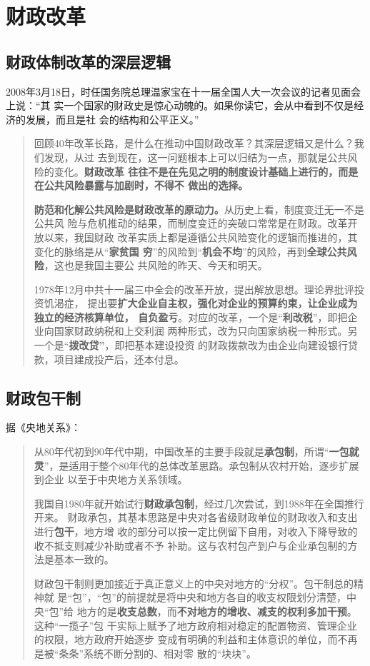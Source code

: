 \section{财政改革}

\subsection{财政体制改革的深层逻辑}

2008年3月18日，时任国务院总理温家宝在十一届全国人大一次会议的记者见面会上说：“其
实一个国家的财政史是惊心动魄的。如果你读它，会从中看到不仅是经济的发展，而且是社
会的结构和公平正义。”

\begin{quotation}
  回顾40年改革长路，是什么在推动中国财政改革？其深层逻辑又是什么？我们发现，从过
  去到现在，这一问题根本上可以归结为一点，那就是公共风险的变化。\textbf{财政改革
    往往不是在先见之明的制度设计基础上进行的，而是在公共风险暴露与加剧时，不得不
    做出的选择。}

  \textbf{防范和化解公共风险是财政改革的原动力。}从历史上看，制度变迁无一不是公共风
  险与危机推动的结果，而制度变迁的突破口常常是在财政。改革开放以来，我国财政
  改革实质上都是遵循公共风险变化的逻辑而推进的，其变化的脉络是从“\textbf{家贫国
    穷}”的风险到“\textbf{机会不均}”的风险，再到\textbf{全球公共风险}，这也是我国主要公
  共风险的昨天、今天和明天。\cite{cai40}

  1978年12月中共十一届三中全会的改革开放，提出解放思想。理论界批评投资饥渴症，
  提出要\textbf{扩大企业自主权，强化对企业的预算约束，让企业成为独立的经济核算单位，
  自负盈亏}。对应的改革，一个是“\textbf{利改税}”，即把企业向国家财政纳税和上交利润
  两种形式，改为只向国家纳税一种形式。另一个是“\textbf{拨改贷”}，即把基本建设投资
  的财政拨款改为由企业向建设银行贷款，项目建成投产后，还本付息。\cite{bogaidai30}
\end{quotation}

\subsection{财政包干制}

据《央地关系》\cite{yangdi}：
\begin{quotation}
  从80年代初到90年代中期，中国改革的主要手段就是\textbf{承包制}，所谓“\textbf{一包就
    灵}”，是适用于整个80年代的总体改革思路。承包制从农村开始，逐步扩展到企业
  以至于中央地方关系领域。

  我国自1980年就开始试行\textbf{财政承包制}，经过几次尝试，到1988年在全国推行开来。
  财政承包，其基本思路是中央对各省级财政单位的财政收入和支出进行\textbf{包干}，地方增
  收的部分可以按一定比例留下自用，对收入下降导致的收不抵支则减少补助或者不予
  补助。这与农村包产到户与企业承包制的方法是基本一致的。

  财政包干制则更加接近于真正意义上的中央对地方的“分权”。包干制总的精神就
  是“包”，“包”的前提就是将中央和地方各自的收支权限划分清楚，中央“包”给
  地方的是\textbf{收支总数}，而\textbf{不对地方的增收、减支的权利多加干预}。这种“一揽子”包
  干实际上赋予了地方政府相对稳定的配置物资、管理企业的权限，地方政府开始逐步
  变成有明确的利益和主体意识的单位，而不再是被“条条”系统不断分割的、相对零
  散的“块块”。
\end{quotation}

